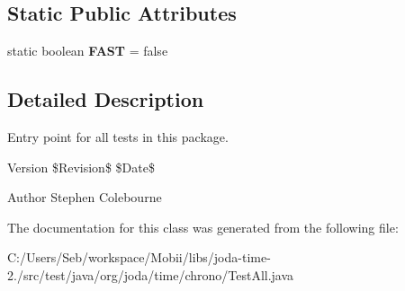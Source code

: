 \subsection*{Static Public Attributes}
\begin{DoxyCompactItemize}
\item 
\hypertarget{classorg_1_1joda_1_1time_1_1chrono_1_1_test_all_a39ed30a1ea305d143cf5117b6a1d1520}{static boolean {\bfseries F\-A\-S\-T} = false}\label{classorg_1_1joda_1_1time_1_1chrono_1_1_test_all_a39ed30a1ea305d143cf5117b6a1d1520}

\end{DoxyCompactItemize}


\subsection{Detailed Description}
Entry point for all tests in this package.

\begin{DoxyVersion}{Version}
\$\-Revision\$ \$\-Date\$
\end{DoxyVersion}
\begin{DoxyAuthor}{Author}
Stephen Colebourne 
\end{DoxyAuthor}


The documentation for this class was generated from the following file\-:\begin{DoxyCompactItemize}
\item 
C\-:/\-Users/\-Seb/workspace/\-Mobii/libs/joda-\/time-\/2./src/test/java/org/joda/time/chrono/Test\-All.\-java\end{DoxyCompactItemize}
